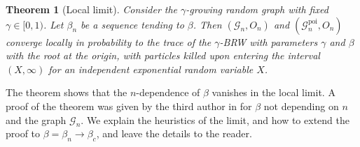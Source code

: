 \documentclass[a4paper, a4wide, 10pt, reqno]{amsart}
\theoremstyle{plain}
\newtheorem{theorem}{Theorem}[section]
\theoremstyle{definition}
\numberwithin{equation}{section}
\newcommand{\sG}{{\mathscr G}}
\begin{document}
    \begin{theorem}[Local limit]\label{thm:local}
        Consider the $\gamma$-growing random graph with fixed $\gamma\in[0, 1)$. Let $\beta_n$ be a sequence tending to $\beta$. Then $(\sG_n, O_n)$ and $(\sG_n^\mathrm{poi}, O_n)$ converge locally in probability to the trace of the $\gamma$-BRW with parameters $\gamma$ and $\beta$ with the root at the origin, with particles killed upon entering the interval $(X, \infty)$ for an independent exponential random variable $X$.
    \end{theorem}
    The theorem shows that the $n$-dependence of $\beta$ vanishes in the local limit. A proof of the theorem was given by the third author in \cite{morters2023tangent} for $\beta$ not depending on $n$ and the graph $\sG_n$. We explain the heuristics of the limit, and how to extend the proof to $\beta=\beta_n\to\beta_c$, and  leave the details to the reader.
\end{document}
